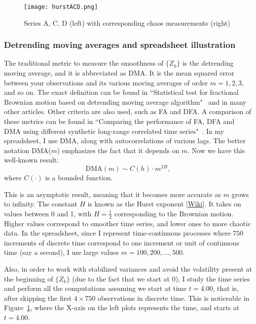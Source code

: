 \documentclass[oneside,10pt]{book}
\begin{document}
\begin{figure}%
\centering
\texttt{[image: hurstACD.png]}  %
\caption{Series A, C, D (left) with corresponding chaos measurements (right)}
\label{fig:hurst}
\end{figure}

\subsubsection{Detrending moving averages and spreadsheet illustration}

The traditional metric to measure the smoothness of $\{Z_k\}$ is the 
\textcolor{index}{detrending moving average}, and it is abbreviated as DMA. It is the mean squared error between your observations and its various moving averages  of order $m = 1, 2, 3$, and so on. 
The exact definition can be found in ``Statistical test for fractional Brownian motion based on detrending moving 
average algorithm"~\cite{grz2018} and in many other articles. Other criteria are also used, such as FA and DFA. A comparison of these metrics can be found in ``Comparing the performance of FA, DFA and DMA using different synthetic long-range correlated time series"~\cite{ying2018}. In my spreadsheet, I use DMA, along with autocorrelations of various lags. The better notation DMA($m$)  emphasizes the fact that it depends on $m$. Now we have this well-known result:
$$
\text{DMA}(m) \sim C(h) \cdot m^{2H},
$$
where $C(\cdot)$ is a bounded function. 

This is an asymptotic result, meaning that it becomes more accurate as $m$ grows to infinity. 
The constant $H$ is known as the \textcolor{index}{Hurst exponent} [\href{https://en.wikipedia.org/wiki/Hurst_exponent}{Wiki}]. It takes on values between 0 and 1, with $H = \frac{1}{2}$ corresponding to the Brownian motion. Higher values correspond to smoother time series, and lower ones to more chaotic data. In the spreadsheet, since I represent time-continuous
 processes where $750$ increments of discrete time correspond to one increment or unit of continuous time (say a second), I use large values 
$m=100,200,\dots, 500$. 

Also, in order to work with stabilized variances and avoid the volatility present at the beginning of $\{Z_k\}$ (due to the fact that we start at 0), I study the time series and perform all the computations assuming we start at time $t=4.00$, that is,
 after skipping the first $4\times 750$ observations in discrete time. This is noticeable in Figure~\ref{fig:hurst}, where the X-axis
 on the left plots represents the time, and starts at $t=4.00$.   
\end{document}
